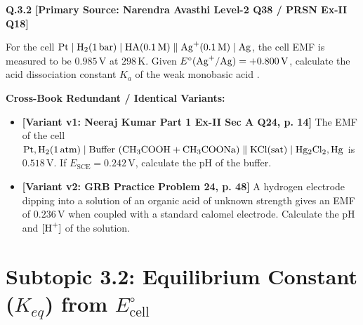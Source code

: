\begin{problembox}
\textbf{Q.3.2} \hfill \textbf{[Primary Source: Narendra Avasthi Level-2 Q38 / PRSN Ex-II Q18]}
\label{q:qb-c3-02}

For the cell $\ce{Pt} \mid \ce{H2}(1\,\text{bar}) \mid \ce{HA}(0.1\,\text{M}) \parallel \ce{Ag+}(0.1\,\text{M}) \mid \ce{Ag}$, the cell EMF is measured to be $0.985\,\text{V}$ at $298\,\text{K}$. Given $E^\circ(\ce{Ag+/Ag}) = +0.800\,\text{V}$, calculate the acid dissociation constant $K_a$ of the weak monobasic acid .

\tcbline
\textbf{\color{accentamber}Cross-Book Redundant / Identical Variants:}
\begin{itemize}[leftmargin=*,itemsep=2pt]
    \item \textbf{[Variant v1: Neeraj Kumar Part 1 Ex-II Sec A Q24, p. 14]} The EMF of the cell $\ce{Pt, H2}(1\,\text{atm}) \mid \text{Buffer } (\ce{CH3COOH} + \ce{CH3COONa}) \parallel \ce{KCl}(\text{sat}) \mid \ce{Hg2Cl2}, \ce{Hg}$ is $0.518\,\text{V}$. If $E_{\text{SCE}} = 0.242\,\text{V}$, calculate the pH of the buffer.
    \item \textbf{[Variant v2: GRB Practice Problem 24, p. 48]} A hydrogen electrode dipping into a solution of an organic acid of unknown strength gives an EMF of $0.236\,\text{V}$ when coupled with a standard calomel electrode. Calculate the pH and $[\ce{H+}]$ of the solution.
\end{itemize}
\end{problembox}

\section{Subtopic 3.2: Equilibrium Constant ($K_{eq}$) from $E^\circ_{\text{cell}}$}

